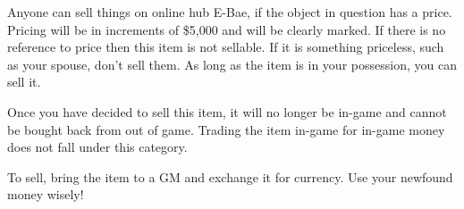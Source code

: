 \documentclass[green]{LRSguildcamp1}
\begin{document}
\name{\gSellingThing{}}
 
Anyone can sell things on online hub E-Bae, if the object in question has a price. Pricing will be in increments of \$5,000 and will be clearly marked. If there is no reference to price then this item is not sellable. If it is something priceless, such as your spouse, don't sell them.  As long as the item is in your possession, you can sell it. 

Once you have decided to sell this item, it will no longer be in-game and cannot be bought back from out of game. Trading the item in-game for in-game money does not fall under this category.  

To sell, bring the item to a GM and exchange it for currency. Use your newfound money wisely! 
\end{document}
